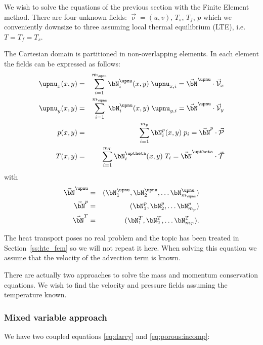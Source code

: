 We wish to solve the equations of the previous section 
with the Finite Element method. 
There are four unknown fields: $\vec{\upnu}=(u,v)$, $T_s$, $T_f$, $p$
which we conveniently downsize to three assuming local thermal equilibrium (LTE), i.e. $T=T_f=T_s$.

The Cartesian domain is partitioned in non-overlapping elements. 
In each element the fields can be expressed as follows:
\begin{eqnarray}
\upnu_x(x,y) &=& \sum_{i=1}^{m_\upnu} \bN_i^\upnu (x,y) \; \upnu_{x,i} = \vec{\bN}^\upnu \cdot \vec{\cal V}_x \\
\upnu_y(x,y) &=& \sum_{i=1}^{m_\upnu} \bN_i^\upnu (x,y) \; \upnu_{y,i} = \vec{\bN}^\upnu \cdot \vec{\cal V}_y \\
p(x,y) &=& \sum_{i=1}^{m_p} \bN_i^p(x,y) \; p_i 
= \vec{\bN}^p \cdot \vec{\cal P} \\
T(x,y) &=& \sum_{i=1}^{m_T} \bN_i^\uptheta (x,y) \; T_i
= \vec{\bN}^\uptheta \cdot \vec{\cal T}
\end{eqnarray}
with
\begin{eqnarray}
\vec{\bN}^\upnu &=& (\bN^\upnu_1, \bN^\upnu_2, \dots \bN^\upnu_{m_\upnu}) \\
\vec{\bN}^p &=& (\bN^p_1, \bN^p_2, \dots \bN^p_{m_p}) \\
\vec{\bN}^T &=& (\bN^T_1, \bN^T_2, \dots \bN^T_{m_T}).
\end{eqnarray}

The heat transport poses no real problem and the topic has been treated in Section~\ref{ss:hte_fem} so we will not repeat it here. When solving this equation we assume that the velocity of the advection term is known.

There are actually two approaches to solve the mass and momentum conservation equations.
We wish to find the velocity and pressure fields assuming the temperature known. 

\subsubsection{Mixed variable approach}

We have two coupled equations \eqref{eq:darcy} and \eqref{eq:porous:incomp}:

